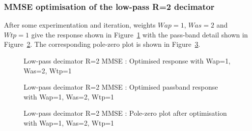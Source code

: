 \documentclass[a4paper,twoside,10pt,english]{report}
\begin{document}
\subsubsection{MMSE optimisation of the low-pass R=2 decimator}
After some experimentation and iteration, weights $Wap=1$, $Was=2$ and 
$Wtp=1$ give the response shown in Figure~\ref{fig:Decimator-R-2-MMSE-x1}
with the pass-band detail shown in 
Figure~\ref{fig:Decimator-R-2-MMSE-x1-passband}. The corresponding 
pole-zero plot is shown in Figure~\ref{fig:Decimator-R-2-MMSE-x1-pz}.
\begin{figure}[!htbp]
\begin{center}
\scalebox{0.7}{}
\caption{Low-pass decimator R=2 MMSE : Optimised response with Wap=1, Was=2, Wtp=1}
\label{fig:Decimator-R-2-MMSE-x1}
\end{center}
\end{figure}
\begin{figure}[!htbp]
\begin{center}
\scalebox{0.7}{}
\caption{Low-pass decimator R=2 MMSE : Optimised passband response with Wap=1, Was=2, Wtp=1}
\label{fig:Decimator-R-2-MMSE-x1-passband}
\end{center}
\end{figure}
\begin{figure}[!htbp]
\begin{center}
\scalebox{0.7}{}
\caption{Low-pass decimator R=2 MMSE : Pole-zero plot after optimisation with Wap=1, Was=2, Wtp=1}
\label{fig:Decimator-R-2-MMSE-x1-pz}
\end{center}
\end{figure}
\end{document}
